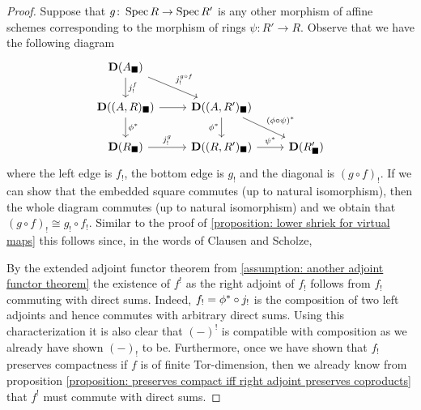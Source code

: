 \begin{proof}
	Suppose that $g\colon \operatorname{Spec} R\to\operatorname{Spec} R'$ is any other morphism of affine schemes corresponding to the morphism of rings $\psi\colon R'\to R$. Observe that we have the following diagram
	$$\begin{tikzcd}
		\derived{A_\blacksquare}\ar[d, "{j^f_!}"]\ar[dr, "{j_!^{g\circ f}}"]&&\\
		\derived{(A, R)_\blacksquare}\ar[d, "\scalarRestriction{\phi}"]\ar[r] &\derived{(A, R')_\blacksquare}\ar[d, "\scalarRestriction{\phi}", swap]\ar[dr, "\scalarRestriction{(\phi\circ\psi)}"]&\\
		\derived{R_\blacksquare}\ar[r, "j^g_!"] &\derived{(R, R')_\blacksquare}\ar[r, "\scalarRestriction{\psi}"] &\derived{R'_\blacksquare}
	\end{tikzcd}$$
	where the left edge is $f_!$, the bottom edge is $g_!$ and the diagonal is $(g\circ f)_!$. If we can show that the embedded square commutes (up to natural isomorphism), then the whole diagram commutes (up to natural isomorphism) and we obtain that $(g\circ f)_!\cong g_!\circ f_!$. Similar to the proof of \ref{proposition: lower shriek for virtual maps} this follows since, in the words of Clausen and Scholze, 
	
	By the extended adjoint functor theorem from \assumptionPreWord \ref{assumption: another adjoint functor theorem} the existence of $f^!$ as the right adjoint of $f_!$ follows from $f_!$ commuting with direct sums. Indeed, $f_! = {\phi^\ast} \circ j_!$ is the composition of two left adjoints and hence commutes with arbitrary direct sums. Using this characterization it is also clear that $(-)^!$ is compatible with composition as we already have shown $(-)_!$ to be. Furthermore, once we have shown that $f_!$ preserves compactness if $f$ is of finite Tor-dimension, then we already know from proposition \ref{proposition: preserves compact iff right adjoint preserves coproducts} that $f^!$ must commute with direct sums.
	

\end{proof}
